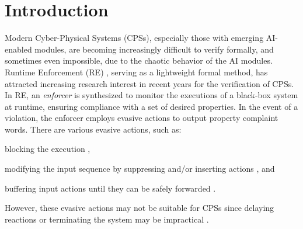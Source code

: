 \section{Introduction}






Modern Cyber-Physical Systems (CPSs), especially those with emerging AI-enabled modules, are becoming increasingly difficult to verify formally, and sometimes even impossible, due to the chaotic behavior of the AI modules. Runtime Enforcement (RE) \cite{schneider2000enforceable}, serving as a lightweight formal method, has attracted increasing research interest in recent years for the verification of CPSs.
In RE, an \emph{enforcer} is synthesized to monitor the executions of a black-box system at runtime, ensuring compliance with a set of desired properties. In the event of a violation, the enforcer employs evasive actions to output property complaint words.  %
There are various evasive actions, such as:
\begin{enumerate*}[label=(\roman*)]
    \item blocking the execution \cite{10.1145/353323.353382},
    \item modifying the input sequence by suppressing and/or inserting actions \cite{10.1007/s10207-004-0046-8,10.1145/1455526.1455532}, and
    \item buffering input actions until they can be safely forwarded \cite{DBLP:journals/fmsd/FalconeMFR11,10.1007/978-3-030-32079-9_4,10.1007/978-3-642-35632-2_23,10.1007/s10703-014-0215-y,10.1016/j.scico.2016.02.008}.
\end{enumerate*}
However, these evasive actions may not be suitable for CPSs since delaying reactions or terminating the system may be impractical \cite{10.1145/3092282.3092291}. 

